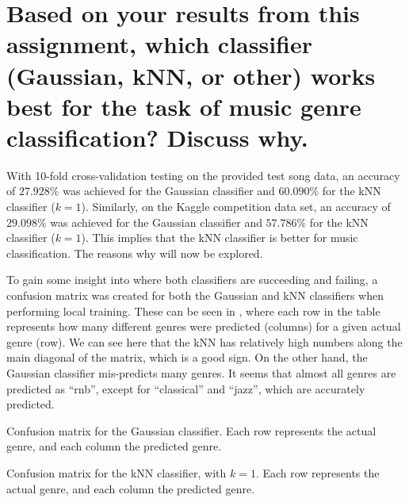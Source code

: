 \documentclass[a4paper,titlepage]{article}
\begin{document}
	
	\section{Based on your results from this assignment, which classifier (Gaussian, kNN, or other) works best for the task of music genre classification? Discuss why.}
	
	With 10-fold cross-validation testing on the provided test song data, an accuracy of $27.928\%$ was achieved for the Gaussian classifier and $60.090\%$ for the kNN classifier ($k = 1$). Similarly, on the Kaggle competition data set, an accuracy of $29.098\%$ was achieved for the Gaussian classifier and $57.786\%$ for the kNN classifier ($k = 1$). This implies that the kNN classifier is better for music classification. The reasons why will now be explored.
	
	To gain some insight into where both classifiers are succeeding and failing, a confusion matrix was created for both the Gaussian and kNN classifiers when performing local training. These can be seen in , where each row in the table represents how many different genres were predicted (columns) for a given actual genre (row). We can see here that the kNN has relatively high numbers along the main diagonal of the matrix, which is a good sign. On the other hand, the Gaussian classifier mis-predicts many genres. It seems that almost all genres are predicted as ``rnb'', except for ``classical'' and ``jazz'', which are accurately predicted.
	
	\begin{table}[!htb]
		\centering
		\caption{Confusion matrix for the Gaussian classifier. Each row represents the actual genre, and each column the predicted genre.}
		\label{table:confusion_gaussian}
	\end{table}

	\begin{table}[!htb]
		\centering
		\caption{Confusion matrix for the kNN classifier, with $k = 1$. Each row represents the actual genre, and each column the predicted genre.}
		\label{table:confusion_knn_1}
	\end{table}
	
\end{document}
